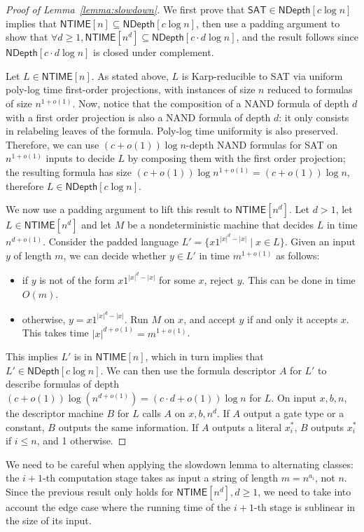 \documentclass[a4paper, 11pt]{article}
\theoremstyle{plain}
\theoremstyle{definition}
\theoremstyle{remark}
\newcommand{\NTIME}{\textsf{NTIME}}%
\newcommand{\SAT}{\textsf{SAT}}%
\newcommand{\ND}{\textsf{NDepth}}%
\newcommand{\NDL}[1]{\ND[ #1 \log n]}%
\begin{document}
\begin{proof}[Proof of Lemma~\ref{lemma:slowdown}]
	We first prove that $\SAT{}\in \NDL{c}$ implies that $\NTIME[n] \subseteq \NDL{c}$,
	then use a padding argument to show that $\forall d\ge 1, \NTIME[n^d] \subseteq \NDL{c\cdot d}$,
	and the result follows since $\NDL{c\cdot d}$ is closed under complement.

	Let $L\in\NTIME[n]$. 
	As stated above, $L$ is Karp-reducible to \SAT{} via
	uniform poly-log time first-order projections, 
	with instances of size $n$ reduced to formulas of size $n^{1+o(1)}$.
	Now, notice that the composition of a NAND formula of depth $d$ with a first order projection
	is also a NAND formula of depth $d$: it only consists in relabeling leaves of the formula.
	Poly-log time uniformity is also preserved. 
	Therefore, we can use $(c+o(1)) \log n$-depth NAND formulas for \SAT{} on $n^{1+o(1)}$
	inputs to decide $L$ by composing them with the first order projection; 
	the resulting formula has size $(c+o(1)) \log n^{1+o(1)} = (c+o(1)) \log n$,
	therefore $L\in\NDL{c}$.

	We now use a padding argument to lift this result to $\NTIME[n^d]$.
	Let $d>1$, let $L\in \NTIME[n^d]$ and let $M$ be a nondeterministic machine that decides $L$
	in time $n^{d+o(1)}$.
	Consider the padded language $L' = \{x1^{|x|^d - |x|} \mid x\in L\}$.
	Given an input $y$ of length $m$, we can decide whether $y\in L'$ in time 
	$m^{1+o(1)}$ as follows:
	\begin{itemize}
		\item if $y$ is not of the form $x1^{|x|^d - |x|}$ for some $x$, reject $y$.
		This can be done in time $O(m)$.
		\item otherwise, $y = x1^{|x|^d - |x|}$. Run $M$ on $x$, and accept $y$ 
		if and only it accepts $x$. This takes time $|x|^{d+o(1)} = m^{1+o(1)}$.
	\end{itemize}
	This implies $L'$ is in $\NTIME[n]$, which in turn implies that $L'\in\NDL{c}$.
	We can then use the formula descriptor $A$ for $L'$ 
	to describe formulas of depth $(c + o(1))\log \left(n^{d+o(1)}\right) = (c\cdot d + o(1))\log n$ for $L$.
	On input $x,b,n$, the descriptor machine $B$ for $L$  
	calls $A$ on $x, b, n^d$.
	If $A$ output a gate type or a constant, $B$ outputs the same information.
	If $A$ outputs a literal $x_i^*$, $B$ outputs $x_i^*$ if $i \le n$, and 1 otherwise.
\end{proof}

We need to be careful when applying the slowdown lemma to alternating classes:
the $i+1$-th computation stage takes as input a string of length $m = n^{a_i}$, not $n$.
Since the previous result only holds for $\NTIME[n^d], d \ge 1$, 
we need to take into account the edge case where the running time of the $i+1$-th
stage is sublinear in the size of its input.
\end{document}
